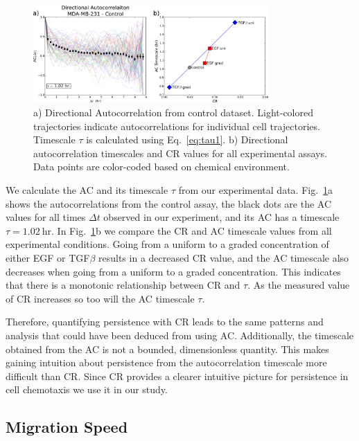 \begin{figure}[ht]
    \centering
    \includegraphics[width=0.80\textwidth]{../fig/ch2_fig5.png}
    \caption{a) Directional Autocorrelation from control dataset. Light-colored trajectories indicate autocorrelations for individual cell trajectories. Timescale $\tau$ is calculated using Eq.\ \ref{eq:tau1}. b) Directional autocorrelation timescales and CR values for all experimental assays. Data points are color-coded based on chemical environment.} \label{fig:ch2_5}
\end{figure}

We calculate the AC and its timescale $\tau$ from our experimental data. Fig.\ \ref{fig:ch2_5}a shows the autocorrelations from the control assay, the black dots are the AC values for all times $\Delta t$ observed in our experiment, and its AC has a timescale
$\tau = 1.02 \ \text{hr}$.
In Fig.\ \ref{fig:ch2_5}b we compare the CR and AC timescale values from all experimental conditions. Going from a uniform to a graded concentration of either EGF or TGF$\beta$ results in a decreased CR value, and the AC timescale also decreases when going from a uniform to a graded concentration. This indicates that there is a monotonic relationship between CR and $\tau$. As the measured value of CR increases so too will the AC timescale $\tau$.

Therefore, quantifying persistence with CR leads to the same patterns and analysis that could have been deduced from using AC. Additionally, the timescale obtained from the AC is not a bounded, dimensionless quantity. This makes gaining intuition about persistence from the autocorrelation timescale more difficult than CR. Since CR provides a clearer intuitive picture for persistence in cell chemotaxis we use it in our study.

\subsection{Migration Speed}


